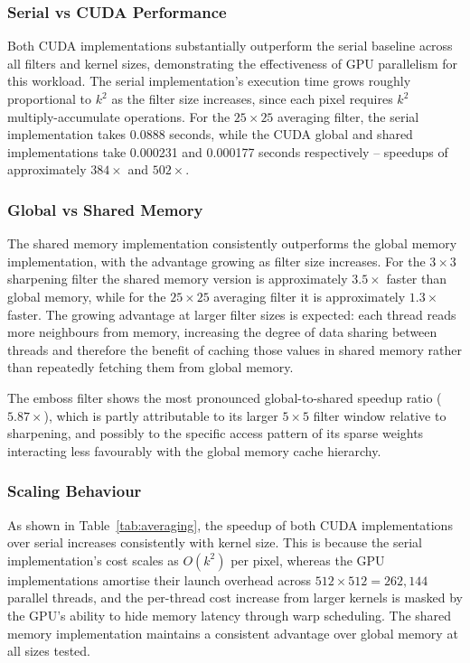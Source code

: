 \subsubsection{Serial vs CUDA Performance}

Both CUDA implementations substantially outperform the serial baseline across all filters and kernel sizes, demonstrating the effectiveness of GPU parallelism for this workload. The serial implementation's execution time grows roughly proportional to $k^2$ as the filter size increases, since each pixel requires $k^2$ multiply-accumulate operations. For the $25\times25$ averaging filter, the serial implementation takes 0.0888 seconds, while the CUDA global and shared implementations take 0.000231 and 0.000177 seconds respectively -- speedups of approximately $384\times$ and $502\times$.

\subsubsection{Global vs Shared Memory}

The shared memory implementation consistently outperforms the global memory implementation, with the advantage growing as filter size increases. For the $3\times3$ sharpening filter the shared memory version is approximately $3.5\times$ faster than global memory, while for the $25\times25$ averaging filter it is approximately $1.3\times$ faster. The growing advantage at larger filter sizes is expected: each thread reads more neighbours from memory, increasing the degree of data sharing between threads and therefore the benefit of caching those values in shared memory rather than repeatedly fetching them from global memory.

The emboss filter shows the most pronounced global-to-shared speedup ratio ($5.87\times$), which is partly attributable to its larger $5\times5$ filter window relative to sharpening, and possibly to the specific access pattern of its sparse weights interacting less favourably with the global memory cache hierarchy.

\subsubsection{Scaling Behaviour}

As shown in Table~\ref{tab:averaging}, the speedup of both CUDA implementations over serial increases consistently with kernel size. This is because the serial implementation's cost scales as $O(k^2)$ per pixel, whereas the GPU implementations amortise their launch overhead across $512\times512 = 262{,}144$ parallel threads, and the per-thread cost increase from larger kernels is masked by the GPU's ability to hide memory latency through warp scheduling. The shared memory implementation maintains a consistent advantage over global memory at all sizes tested.


